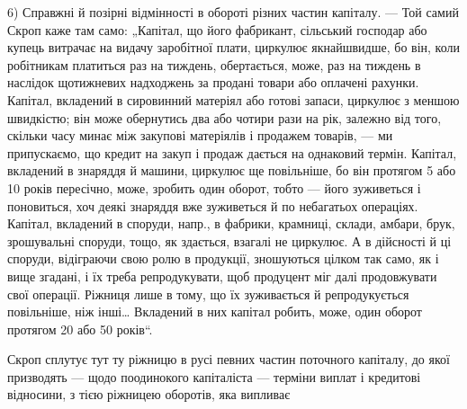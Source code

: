 6) Справжні й позірні відмінності в обороті різних частин капіталу. —
Той самий Скроп каже там само: „Капітал, що його фабрикант, сільський
господар або купець витрачає на видачу заробітної плати, циркулює якнайшвидше,
бо він, коли робітникам платиться раз на тиждень, обертається,
може, раз на тиждень в наслідок щотижневих надходжень за
продані товари або оплачені рахунки. Капітал, вкладений в сировинний
матеріял або готові запаси, циркулює з меншою швидкістю; він може
обернутись два або чотири рази на рік, залежно від того, скільки
часу минає між закупові матеріялів і продажем товарів, — ми припускаємо,
що кредит на закуп і продаж дається на однаковий термін. Капітал, вкладений
в знаряддя й машини, циркулює ще повільніше, бо він протягом
5 або 10 років пересічно, може, зробить один оборот, тобто — його зуживеться
і поновиться, хоч деякі знаряддя вже зуживеться й по
небагатьох операціях. Капітал, вкладений в споруди, напр., в фабрики,
крамниці, склади, амбари, брук, зрошувальні споруди, тощо, як здається,
взагалі не циркулює. А в дійсності й ці споруди, відіграючи
свою ролю в продукції, зношуються цілком так само, як і вище згадані,
і їх треба репродукувати, щоб продуцент міг далі продовжувати
свої операції. Ріжниця лише в тому, що їх зуживається й репродукується
повільніше, ніж інші\dots{} Вкладений в них капітал робить, може,
один оборот протягом 20 або 50 років“.

Скроп сплутує тут ту ріжницю в русі певних частин поточного
капіталу, до якої призводять — щодо поодинокого капіталіста — терміни
виплат і кредитові відносини, з тією ріжницею оборотів, яка випливає
\parbreak{}  %

